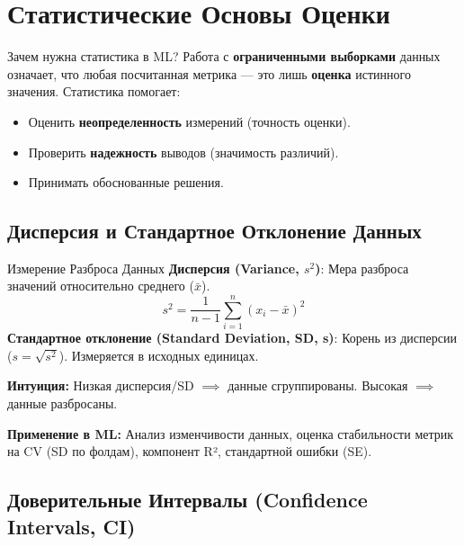 \section{Статистические Основы Оценки}

\begin{alerttextbox}{Зачем нужна статистика в ML?}
Работа с \textbf{ограниченными выборками} данных означает, что любая посчитанная метрика — это лишь \textbf{оценка} истинного значения. Статистика помогает:
\begin{itemize}[nosep, leftmargin=*]
    \item Оценить \textbf{неопределенность} измерений (точность оценки).
    \item Проверить \textbf{надежность} выводов (значимость различий).
    \item Принимать обоснованные решения.
\end{itemize}
\end{alerttextbox}

\subsection{Дисперсия и Стандартное Отклонение Данных}
\begin{textbox}{Измерение Разброса Данных}
\textbf{Дисперсия (Variance, $s^2$)}: Мера разброса значений относительно среднего ($\bar{x}$).
\[ s^2 = \frac{1}{n-1} \sum_{i=1}^{n} (x_i - \bar{x})^2 \]
\textbf{Стандартное отклонение (Standard Deviation, SD, s)}: Корень из дисперсии ($s = \sqrt{s^2}$). Измеряется в исходных единицах.

\textbf{Интуиция:} Низкая дисперсия/SD $\implies$ данные сгруппированы. Высокая $\implies$ данные разбросаны.

\textbf{Применение в ML:} Анализ изменчивости данных, оценка стабильности метрик на CV (SD по фолдам), компонент R², стандартной ошибки (SE).
\end{textbox}

\subsection{Доверительные Интервалы (Confidence Intervals, CI)}

